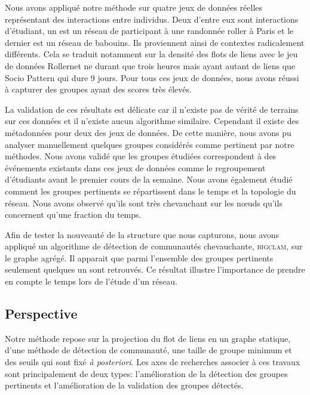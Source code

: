 Nous avons appliqué notre méthode sur quatre jeux de données réelles représentant des interactions entre individus.
Deux d'entre eux sont interactions d'étudiant, un est un réseau de participant à une randonnée roller à Paris et le dernier est un réseau de babouins.
Ils proviennent ainsi de contextes radicalement différents.
Cela se traduit notamment sur la densité des flots de liens avec le jeu de données Rollernet ne durant que trois heures mais ayant autant de liens que Socio Pattern qui dure 9 jours.
Pour tous ces jeux de données, nous avons réussi à capturer des groupes ayant des scores très élevés.

La validation de ces résultats est délicate car il n'existe pas de vérité de terrains sur ces données et il n'existe aucun algorithme similaire.
Cependant il existe des métadonnées pour deux des jeux de données.
De cette manière, nous avons pu analyser manuellement quelques groupes considérés comme pertinent par notre méthodes.
Nous avons validé que les groupes étudiées correspondent à des événements existants dans ces jeux de données comme le regroupement d'étudiants avant le premier cours de la semaine.
Nous avons également étudié comment les groupes pertinents se répartissent dans le temps et la topologie du réseau.
Nous avons observé qu'ils sont très chevauchant sur les n\oe uds qu'ils concernent qu'une fraction du temps.


Afin de tester la nouveauté de la structure que nous capturons, nous avons appliqué un algorithme de détection de communautés chevauchante, \textsc{bigclam}, sur le graphe agrégé.
Il apparait que parmi l'ensemble des groupes pertinents seulement quelques un sont retrouvés.
Ce résultat illustre l'importance de prendre en compte le temps lors de l'étude d'un réseau.


\subsection{Perspective}

Notre méthode repose sur la projection du flot de liens en un graphe statique, d'une méthode de détection de communauté, une taille de groupe minimum et des seuils qui sont fixé \emph{à posteriori}.
Les axes de recherches associer à ces travaux sont principalement de deux types: l'amélioration de la détection des groupes pertinents et l'amélioration de la validation des groupes détectés.

